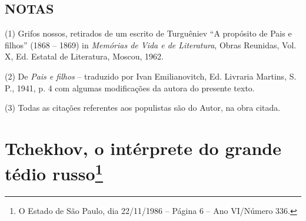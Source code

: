 \section{NOTAS}

(1) Grifos nossos, retirados de um escrito de Turguêniev ``A propósito
de Pais e filhos'' (1868 -- 1869) in \emph{Memórias de Vida e de
Literatura}, Obras Reunidas, Vol. X, Ed. Estatal de Literatura, Moscou,
1962.

(2) De \emph{Pais e filhos} -- traduzido por Ivan Emilianovitch, Ed.
Livraria Martins, S. P., 1941, p. 4 com algumas modificações da autora
do presente texto.

(3) Todas as citações referentes aos populistas são do Autor, na obra
citada.

\chapter{Tchekhov, o intérprete do grande tédio russo\footnote{O Estado
  de São Paulo, dia 22/11/1986 -- Página 6 -- Ano VI/Número 336.}}

